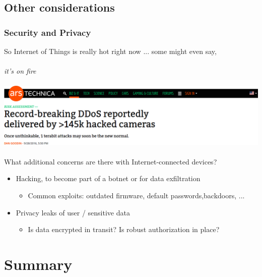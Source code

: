 \documentclass{beamer}
\begin{document}
\subsection{Other considerations}
\begin{frame}[fragile]
\frametitle{Security and Privacy}
So Internet of Things is really hot right now ...
 {
some might even say, \\
\hfill \\
{\centering \textit{it's on fire} \\
\hfill \\
\includegraphics[width=0.7\columnwidth]{external/hacked-headline} \\
\hfill \\
}
What additional concerns are there with Internet-connected devices?
}

 {
\begin{itemize}
  \item Hacking, to become part of a botnet or for data exfiltration
  \begin{itemize}
    \item Common exploits: outdated firmware, default passwords,backdoors, ...
  \end{itemize}
  \item Privacy leaks of user / sensitive data
  \begin{itemize}
    \item Is data encrypted in transit? Is robust authorization in place?
  \end{itemize}
\end{itemize}
}
\end{frame}


\section{Summary} %
\end{document}
